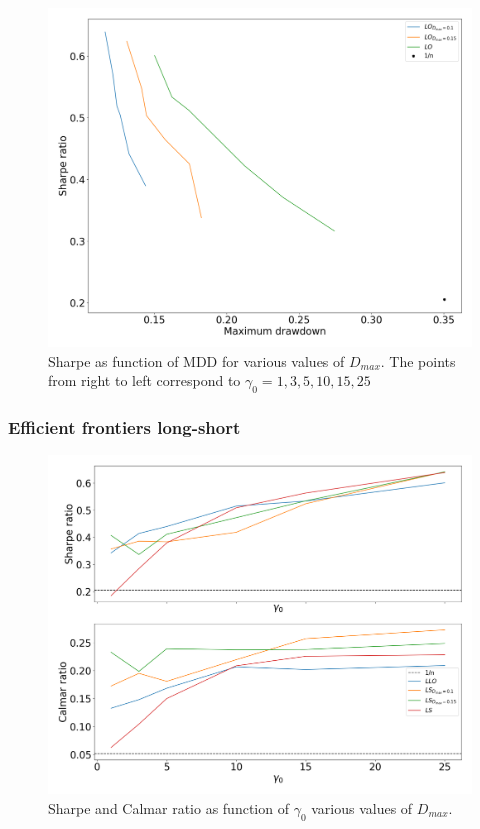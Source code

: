 \begin{figure}[H]
    \centering
    \includegraphics[width=1\textwidth]{analysis/portfolio_exercise/images/mle/sharpe_mdd_lo.png}
    \caption[Sharpe as function of MDD for various values of $D_{max}$]{Sharpe as function of MDD for various values of $D_{max}$. The points from right to left correspond to $\gamma_0=1,3,5,10,15,25$}
    \label{fig:MPC_sharpe_mdd_lo}
\end{figure}

\subsubsection*{Efficient frontiers long-short}

\begin{figure}[H]
    \centering
    \includegraphics[width=1\textwidth]{analysis/portfolio_exercise/images/mle/sharpe_frontier_ls.png}
    \caption[Sharpe and Calmar ratio as function of $\gamma_0$ various values of $D_{max}$]{Sharpe and Calmar ratio as function of $\gamma_0$ various values of $D_{max}$.}
    \label{fig:MPC_sharpe_frontier_ls}
\end{figure}

